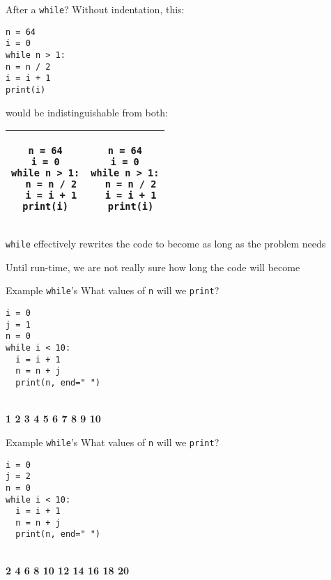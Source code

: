 \documentclass{beamer}
\begin{document}
\begin{frame}[fragile]{After a \texttt{while}?}
Without indentation, this:
\begin{lstlisting}[frame=shadowbox,basicstyle=\ttfamily\tiny]
n = 64
i = 0
while n > 1:
n = n / 2
i = i + 1
print(i)
\end{lstlisting}

would be indistinguishable from both:

\begin{tabular}{| c | c |}
\hline
\begin{lstlisting}[basicstyle=\ttfamily\tiny]
n = 64
i = 0
while n > 1:
  n = n / 2
  i = i + 1
print(i)
\end{lstlisting}
&
\begin{lstlisting}[basicstyle=\ttfamily\tiny]
n = 64
i = 0
while n > 1:
  n = n / 2
  i = i + 1
  print(i)
\end{lstlisting} \\
\hline
\end{tabular}
\end{frame}

\begin{slide}{
\item \texttt{while} effectively rewrites the code to become as long as the problem needs
\item Until run-time, we are not really sure how long the code will become
}\end{slide}

\begin{frame}[fragile]{Example \texttt{while}'s}
What values of \texttt{n} will we \texttt{print}?
\begin{lstlisting}[frame=shadowbox,basicstyle=\ttfamily\tiny]
i = 0
j = 1
n = 0
while i < 10:
  i = i + 1
  n = n + j
  print(n, end=" ")
\end{lstlisting}

\pause

\ \\

\textbf{1 2 3 4 5 6 7 8 9 10}
\end{frame}

\begin{frame}[fragile]{Example \texttt{while}'s}
What values of \texttt{n} will we \texttt{print}?
\begin{lstlisting}[frame=shadowbox,basicstyle=\ttfamily\tiny]
i = 0
j = 2
n = 0
while i < 10:
  i = i + 1
  n = n + j
  print(n, end=" ")
\end{lstlisting}

\pause

\ \\

\textbf{2 4 6 8 10 12 14 16 18 20}
\end{frame}
\end{document}
